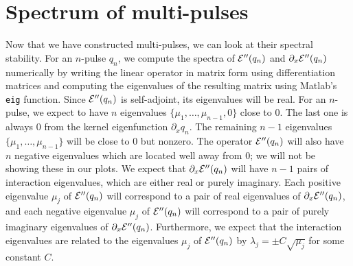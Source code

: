 \documentclass[thesis.tex]{subfiles}
\begin{document}
\section{Spectrum of multi-pulses}

Now that we have constructed multi-pulses, we can look at their spectral stability. For an $n$-pulse $q_n$, we compute the spectra of $\mathcal{E}''(q_n)$ and $\partial_x \mathcal{E}''(q_n)$ numerically by writing the linear operator in matrix form using differentiation matrices and computing the eigenvalues of the resulting matrix using Matlab's \texttt{eig} function. Since $\mathcal{E}''(q_n)$ is self-adjoint, its eigenvalues will be real. For an $n$-pulse, we expect to have $n$ eigenvalues $\{ \mu_1, \dots, \mu_{n-1}, 0 \}$ close to 0. The last one is always 0 from the kernel eigenfunction $\partial_x q_n$. The remaining $n-1$ eigenvalues $\{\mu_1, \dots, \mu_{n-1}\}$ will be close to 0 but nonzero. The operator $\mathcal{E}''(q_n)$ will also have $n$ negative eigenvalues which are located well away from 0; we will not be showing these in our plots. We expect that $\partial_x \mathcal{E}''(q_n)$ will have $n-1$ pairs of interaction eigenvalues, which are either real or purely imaginary. Each positive eigenvalue $\mu_j$ of $\mathcal{E}''(q_n)$ will correspond to a pair of real eigenvalues of $\partial_x \mathcal{E}''(q_n)$, and each negative eigenvalue $\mu_j$ of $\mathcal{E}''(q_n)$ will correspond to a pair of purely imaginary eigenvalues of $\partial_x \mathcal{E}''(q_n)$. Furthermore, we expect that the interaction eigenvalues are related to the eigenvalues $\mu_j$ of $\mathcal{E}''(q_n)$ by $\lambda_j = \pm C \sqrt{\mu_j}$ for some constant $C$.
\end{document}
